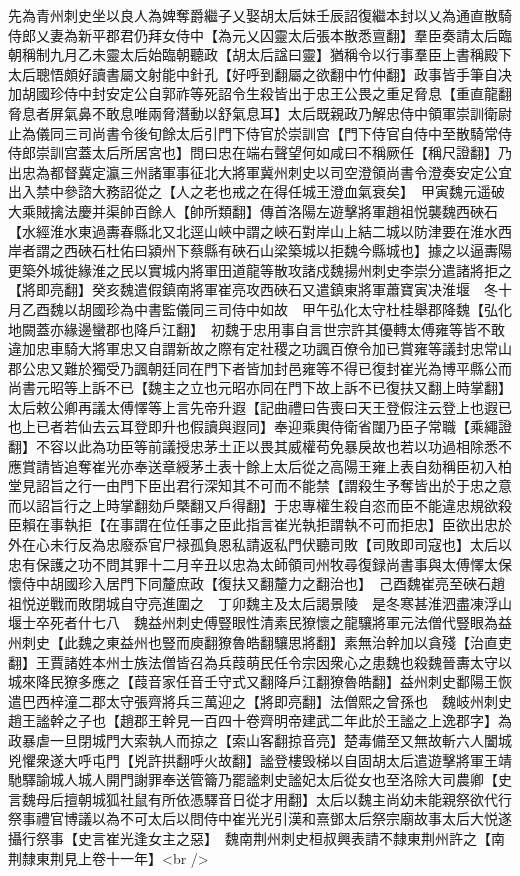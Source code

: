 先為青州刺史坐以良人為婢奪爵繼子乂娶胡太后妹壬辰詔復繼本封以乂為通直散騎侍郎乂妻為新平郡君仍拜女侍中【為元乂囚靈太后張本散悉亶翻】羣臣奏請太后臨朝稱制九月乙未靈太后始臨朝聽政【胡太后諡曰靈】猶稱令以行事羣臣上書稱殿下太后聰悟頗好讀書屬文射能中針孔【好呼到翻屬之欲翻中竹仲翻】政事皆手筆自决加胡國珍侍中封安定公自郭祚等死詔令生殺皆出于忠王公畏之重足脅息【重直龍翻脅息者屏氣鼻不敢息唯兩脅潛動以舒氣息耳】太后既親政乃解忠侍中領軍崇訓衛尉止為儀同三司尚書令後旬餘太后引門下侍官於崇訓宫【門下侍官自侍中至散騎常侍侍郎崇訓宫蓋太后所居宮也】問曰忠在端右聲望何如咸曰不稱厥任【稱尺證翻】乃出忠為都督冀定瀛三州諸軍事征北大將軍冀州刺史以司空澄領尚書令澄奏安定公宜出入禁中參諮大務詔從之【人之老也戒之在得任城王澄血氣衰矣】　甲寅魏元遥破大乘賊擒法慶并渠帥百餘人【帥所類翻】傳首洛陽左遊擊將軍趙祖悦襲魏西硤石【水經淮水東過夀春縣北又北逕山峽中謂之峽石對岸山上結二城以防津要在淮水西岸者謂之西硤石杜佑曰潁州下蔡縣有硤石山梁築城以拒魏今縣城也】據之以逼夀陽更築外城徙緣淮之民以實城内將軍田道龍等散攻諸戍魏揚州刺史李崇分遣諸將拒之【將即亮翻】癸亥魏遣假鎮南將軍崔亮攻西硤石又遣鎮東將軍蕭寶寅决淮堰　冬十月乙酉魏以胡國珍為中書監儀同三司侍中如故　甲午弘化太守杜桂舉郡降魏【弘化地闕蓋亦緣邊蠻郡也降戶江翻】　初魏于忠用事自言世宗許其優轉太傅雍等皆不敢違加忠車騎大將軍忠又自謂新故之際有定社稷之功諷百僚令加已賞雍等議封忠常山郡公忠又難於獨受乃諷朝廷同在門下者皆加封邑雍等不得已復封崔光為博平縣公而尚書元昭等上訴不已【魏主之立也元昭亦同在門下故上訴不已復扶又翻上時掌翻】太后敕公卿再議太傅懌等上言先帝升遐【記曲禮曰告喪曰天王登假注云登上也遐已也上已者若仙去云耳登即升也假讀與遐同】奉迎乘輿侍衛省闥乃臣子常職【乘繩證翻】不容以此為功臣等前議授忠茅土正以畏其威權苟免暴戾故也若以功過相除悉不應賞請皆追奪崔光亦奉送章綬茅土表十餘上太后從之高陽王雍上表自劾稱臣初入柏堂見詔旨之行一由門下臣出君行深知其不可而不能禁【謂殺生予奪皆出於于忠之意而以詔旨行之上時掌翻劾戶槩翻又戶得翻】于忠專權生殺自恣而臣不能違忠規欲殺臣賴在事執拒【在事謂在位任事之臣此指言崔光執拒謂執不可而拒忠】臣欲出忠於外在心未行反為忠廢忝官尸禄孤負恩私請返私門伏聽司敗【司敗即司寇也】太后以忠有保護之功不問其罪十二月辛丑以忠為太師領司州牧尋復録尚書事與太傅懌太保懷侍中胡國珍入居門下同釐庶政【復扶又翻釐力之翻治也】　己酉魏崔亮至硤石趙祖悦逆戰而敗閉城自守亮進圍之　丁卯魏主及太后謁景陵　是冬寒甚淮泗盡凍浮山堰士卒死者什七八　魏益州刺史傅豎眼性清素民獠懷之龍驤將軍元法僧代豎眼為益州刺史【此魏之東益州也豎而庾翻獠魯皓翻驤思將翻】素無治幹加以貪殘【治直吏翻】王賈諸姓本州士族法僧皆召為兵葭萌民任令宗因衆心之患魏也殺魏晉夀太守以城來降民獠多應之【葭音家任音壬守式又翻降戶江翻獠魯皓翻】益州刺史鄱陽王恢遣巴西梓潼二郡太守張齊將兵三萬迎之【將即亮翻】法僧熙之曾孫也　魏岐州刺史趙王謐幹之子也【趙郡王幹見一百四十卷齊明帝建武二年此於王謐之上逸郡字】為政暴虐一旦閉城門大索執人而掠之【索山客翻掠音亮】楚毒備至又無故斬六人闔城兇懼衆遂大呼屯門【兇許拱翻呼火故翻】謐登樓毁梯以自固胡太后遣遊擊將軍王靖馳驛諭城人城人開門謝罪奉送管籥乃罷謐刺史謐妃太后從女也至洛除大司農卿【史言魏母后擅朝城狐社鼠有所依憑驛音日從才用翻】太后以魏主尚幼未能親祭欲代行祭事禮官博議以為不可太后以問侍中崔光光引漢和熹鄧太后祭宗廟故事太后大悦遂攝行祭事【史言崔光逢女主之惡】　魏南荆州刺史桓叔興表請不隸東荆州許之【南荆隸東荆見上卷十一年】<br />
